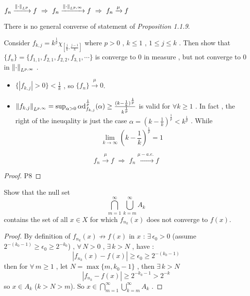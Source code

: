 \begin{proposition*}[1.1.9]
    $f_n\xrightarrow{\norm{\cdot}_{L^p}}f\,\,\Rightarrow \,\, f_n\xrightarrow{\norm{\cdot}_{L^{p,\infty}}}f\,\,
    \Rightarrow \,\,
    f_n\xrightarrow{\mu} f
    $
\end{proposition*}
There is no general converse of statement of {\it Proposition 1.1.9}.
\begin{example*}
    Consider $f_{k,j}=k^{\frac{1}{p}}\chi_{[\frac{j}{k},\frac{j-1}{k}]}$ where $p>0$ , $k\leq 1$ , $1\leq j \leq k$ . Then show that $\{f_n\}=\{f_{1,1},f_{2,1},f_{2,2},f_{3,1},\cdots \}$ is converge to $0$ in measure , but not converge to $0$ in $\norm{\cdot}_{L^{p,\infty}}$ .
    \begin{itemize}
    \item {}
    $\{
    |f_{k,j}|>0    
    \}<\frac{1}{k}$ , so $\{f_n\}\xrightarrow{\mu} 0$.

    \item {}
    $
    \norm{f_{k,j}}_{L^{p,\infty}}
    =
    \sup_{\alpha>0}
    \alpha
    \dd _{f_{k,j}}^{\frac{1}{p}}(\alpha)
    \geq
    \frac{(k-\frac{1}{k})^{\frac{1}{p}}}
    {k^{\frac{1}{p}}}
    $ is valid for $\forall k\geq 1$ . In fact , the right of the ineuqality is just the case $\alpha=\left(k-\frac{1}{k}\right)^{\frac{1}{p}}< k^{\frac{1}{p}}$ . While 
    $$
    \lim_{k\rightarrow \infty}\left(
        k-\frac{1}{k}
    \right)^{\frac{1}{p}}
    =1
    $$
    \myend
    \end{itemize} 
\end{example*}

\begin{theorem*}[1.1.11]
$$
f_n\xrightarrow{\mu}f
\,\,
\Rightarrow
\,\,
f_n\xrightarrow{\mu-a.e.}f
$$
\end{theorem*}
\begin{proof}
    P8
\end{proof}
\begin{remark*}
    Show that the null set 
    $$
    \bigcap_{m=1}^{\infty}
    \bigcup_{k=m}^{\infty}
    A_k
    $$
    contains the set of all $x\in X$ for which $f_{n_k}(x)$ does not converge to $f(x)$.
\end{remark*}
\begin{proof}
    By definition of $f_{n_k}(x)\not\rightarrow f(x) $ in $x$ : $\exists\, \epsilon_0>0$ (assume $2^{-(k_0-1)}\geq \epsilon_0\geq 2^{-k_0}$) , $\forall \, N>0$ , $\exists \,k>N$ , have :
    $$
    |f_{n_k}(x)-f(x)|\geq \epsilon_0\geq 2^{-(k_0-1)}
    $$
    then for $\forall \, m\geq 1$ , let $N=\max\{m,k_0-1\}$ , then $\exists \, k>N$
    $$
    |f_{n_k}-f(x)|
    \geq
    2^{-k_0-1}
    >2^{-k}
    $$
    so $x\in A_k$ ($k>N>m$).
     So $x\in \bigcap_{m=1}^{\infty}
     \bigcup_{k=m}^{\infty}
     A_k$ .
\end{proof}

